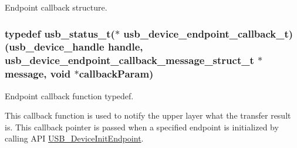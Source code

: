 Endpoint callback structure. 

\hypertarget{group__usb__device__driver_gac780580992587eb809d445edcba7c3ca}{
\subsubsection[{usb\-\_\-device\-\_\-endpoint\-\_\-callback\-\_\-t}]{\setlength{\rightskip}{0pt plus 5cm}typedef {\bf usb\-\_\-status\-\_\-t}($\ast$ usb\-\_\-device\-\_\-endpoint\-\_\-callback\-\_\-t)({\bf usb\-\_\-device\-\_\-handle} handle, {\bf usb\-\_\-device\-\_\-endpoint\-\_\-callback\-\_\-message\-\_\-struct\-\_\-t} $\ast$message, void $\ast$callback\-Param)}}\label{group__usb__device__driver_gac780580992587eb809d445edcba7c3ca}


Endpoint callback function typedef. 

This callback function is used to notify the upper layer what the transfer result is. This callback pointer is passed when a specified endpoint is initialized by calling A\-P\-I \hyperlink{group__usb__device__driver_ga3302bb97cb7e4a0a805f8dec3cabd07f}{U\-S\-B\-\_\-\-Device\-Init\-Endpoint}.



